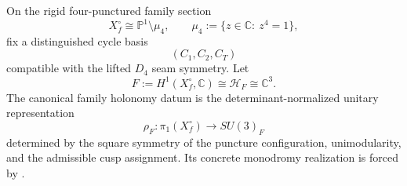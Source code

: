 \begin{definition}
\label{def:canonical-cycle-holonomy}
On the rigid four-punctured family section
\[
X_f^\circ\cong \mathbb P^1\setminus\mu_4,
\qquad
\mu_4:=\{z\in\mathbb C:\ z^4=1\},
\]
fix a distinguished cycle basis
\[
(C_1,C_2,C_T)
\]
compatible with the lifted $D_4$ seam symmetry. Let
\[
F:=H^1(X_f^\circ,\mathbb C)\cong\mathcal H_F\cong\mathbb C^3.
\]
The canonical family holonomy datum is the determinant-normalized unitary representation
\[
\rho_F:\pi_1(X_f^\circ)\to SU(3)_F
\]
determined by the square symmetry of the puncture configuration, unimodularity, and the
admissible cusp assignment. Its concrete monodromy realization is forced by
.
\end{definition}

